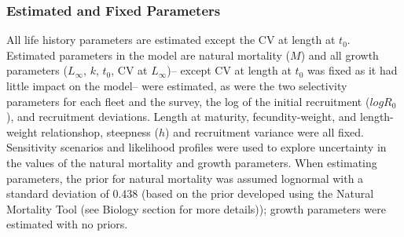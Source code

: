 \documentclass[11pt,
  english,
  a4paper,
]{article}
\begin{document}
\leavevmode\tagmcend\tagstructend\par


\hypertarget{estimated-and-fixed-parameters}{%
\subsubsection{Estimated and Fixed Parameters}\label{estimated-and-fixed-parameters}}

\leavevmode\tagmcend\tagstructend


All life history parameters are estimated except the CV at length at {\(t_0\)\leavevmode\tagmcend\tagstructend}. Estimated parameters in the model are natural mortality ({\(M\)\leavevmode\tagmcend\tagstructend}) and all growth parameters ({\(L_{\infty}\)\leavevmode\tagmcend\tagstructend}, {\(k\)\leavevmode\tagmcend\tagstructend}, {\(t_0\)\leavevmode\tagmcend\tagstructend}, CV at {\(L_{\infty}\)\leavevmode\tagmcend\tagstructend})-- except CV at length at {\(t_0\)\leavevmode\tagmcend\tagstructend} was fixed as it had little impact on the model-- were estimated, as were the two selectivity parameters for each fleet and the survey, the log of the initial recruitment ({\(logR_0\)\leavevmode\tagmcend\tagstructend}), and recruitment deviations. Length at maturity, fecundity-weight, and length-weight relationshop, steepness ({\(h\)\leavevmode\tagmcend\tagstructend}) and recruitment variance were all fixed. Sensitivity scenarios and likelihood profiles were used to explore uncertainty in the values of the natural mortality and growth parameters. When estimating parameters, the prior for natural mortality was assumed lognormal with a standard deviation of 0.438 (based on the prior developed using the Natural Mortality Tool (see Biology section for more details)); growth parameters were estimated with no priors.

\leavevmode\tagmcend\tagstructend\par
\end{document}
